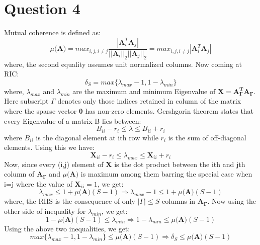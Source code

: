 \documentclass[12pt]{article}
\begin{document}
\section*{Question 4}
Mutual coherence is defined as:
\begin{equation*}
    \mu(\boldsymbol{A)} = max_{i, j, i \neq j}\frac{|\boldsymbol{A}_i^T\boldsymbol{A}_j|}{||\boldsymbol{A}_i||_2||\boldsymbol{A}_j||_2} = max_{i, j, i \neq j}|\boldsymbol{A}_i^T\boldsymbol{A}_j| 
\end{equation*}
where, the second equality assumes unit normalized columns.
Now coming at RIC:
\begin{equation*}
    \delta_S = max\{\lambda_{max}-1, 1-\lambda_{min}\}
\end{equation*}
where, $\lambda_{max}$ and $\lambda_{min}$ are the maximum and minimum Eigenvalue of $\boldsymbol{X} = \boldsymbol{A_{\Gamma}^TA_{\Gamma}}$. Here subscript $\Gamma$ denotes only those indices retained in column of the matrix where the sparse vector $\boldsymbol{\theta}$ has non-zero elements. 
Gershgorin theorem states that every Eigenvalue of a matrix B lies between:
\begin{equation*}
    B_{ii}-r_i \leq \lambda \leq B_{ii}+r_i
\end{equation*}
where $B_{ii}$ is the diagonal element at ith row while $r_i$ is the sum of off-diagonal elements. Using this we have:
\begin{equation*}
    \boldsymbol{X}_{ii}-r_i \leq \lambda_{max} \leq \boldsymbol{X}_{ii}+r_i
\end{equation*}
Now, since every (i,j) element of $\boldsymbol{X}$ is the dot product between the ith and jth column of $\boldsymbol{A_{\Gamma}}$ and $\mu(\boldsymbol{A)}$ is maximum among them barring the special case when i=j where the value of $\boldsymbol{X}_{ii} = 1$, we get:
\begin{equation*}
     \lambda_{max} \leq 1+\mu(\boldsymbol{A)}(S-1) \Longrightarrow \lambda_{max}-1 \leq 1+\mu(\boldsymbol{A)}(S-1)
\end{equation*}
where, the RHS is the consequence of only $|\Gamma| \leq S$ columns in $\boldsymbol{A_{\Gamma}}$. Now using the other side of inequality for $\lambda_{min}$, we get:
\begin{equation*}
  1-\mu(\boldsymbol{A)}(S-1) \leq \lambda_{min} \Longrightarrow 1-\lambda_{min} \leq \mu(\boldsymbol{A)}(S-1)
\end{equation*}
Using the above two inequalities, we get:
\begin{equation*}
  max\{\lambda_{max}-1, 1-\lambda_{min}\} \leq \mu(\boldsymbol{A)}(S-1) \Longrightarrow \delta_S \leq \mu(\boldsymbol{A)}(S-1)
\end{equation*}
\end{document}
